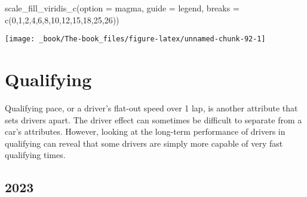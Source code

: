 \documentclass[
]{book}
\newenvironment{Shaded}{\begin{snugshade}}{\end{snugshade}}
\newcommand{\AttributeTok}[1]{\textcolor[rgb]{0.77,0.63,0.00}{#1}}
\newcommand{\DecValTok}[1]{\textcolor[rgb]{0.00,0.00,0.81}{#1}}
\newcommand{\FunctionTok}[1]{\textcolor[rgb]{0.00,0.00,0.00}{#1}}
\newcommand{\NormalTok}[1]{#1}
\newcommand{\StringTok}[1]{\textcolor[rgb]{0.31,0.60,0.02}{#1}}
\begin{document}
\begin{Shaded}
\begin{Highlighting}[]
  \FunctionTok{scale\_fill\_viridis\_c}\NormalTok{(}\AttributeTok{option =} \StringTok{\textquotesingle{}magma\textquotesingle{}}\NormalTok{,}
                       \AttributeTok{guide =} \StringTok{\textquotesingle{}legend\textquotesingle{}}\NormalTok{,}
                       \AttributeTok{breaks =} \FunctionTok{c}\NormalTok{(}\DecValTok{0}\NormalTok{,}\DecValTok{1}\NormalTok{,}\DecValTok{2}\NormalTok{,}\DecValTok{4}\NormalTok{,}\DecValTok{6}\NormalTok{,}\DecValTok{8}\NormalTok{,}\DecValTok{10}\NormalTok{,}\DecValTok{12}\NormalTok{,}\DecValTok{15}\NormalTok{,}\DecValTok{18}\NormalTok{,}\DecValTok{25}\NormalTok{,}\DecValTok{26}\NormalTok{))}
\end{Highlighting}
\end{Shaded}

\begin{center}\texttt{[image: \_book/The-book\_files/figure-latex/unnamed-chunk-92-1]} \end{center}

\hypertarget{qualifying-1}{%
\section{Qualifying}\label{qualifying-1}}

Qualifying pace, or a driver's flat-out speed over 1 lap, is another attribute that sets drivers apart. The driver effect can sometimes be difficult to separate from a car's attributes. However, looking at the long-term performance of drivers in qualifying can reveal that some drivers are simply more capable of very fast qualifying times.

\hypertarget{section}{%
\subsection{2023}\label{section}}
\end{document}
